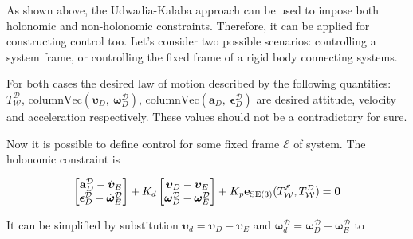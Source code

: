 As shown above, the Udwadia-Kalaba approach can be used to impose both holonomic and 
non-holonomic constraints. Therefore, it can be applied for constructing control too. 
Let's consider two possible scenarios: controlling a system frame, or controlling the 
fixed frame of a rigid body connecting systems.

For both cases the desired law of motion described by the following quantities: 
$T_{\mathcal{W}}^{\mathcal{D}}$, $\text{columnVec}(\boldsymbol{\upsilon}_D, \ 
\boldsymbol{\omega}_D^{\mathcal{D}})$, $\text{columnVec}(\mathbf{a}_D, \ 
\boldsymbol{\epsilon}_D^{\mathcal{D}})$ are desired attitude, velocity and 
acceleration respectively. These values should not be a contradictory for 
sure. 

Now it is possible to define control for some fixed frame $\mathcal{E}$ of system. 
The holonomic constraint is 

\begin{equation}
    \begin{bmatrix}
        \mathbf{a}_D^{\mathcal{D}} - \dot{\boldsymbol{\upsilon}}_E \\
        \boldsymbol{\epsilon}_D^{\mathcal{D}} - 
        \dot{\boldsymbol{\omega}}_E^{\mathcal{D}}
    \end{bmatrix}
    + K_d
    \begin{bmatrix}
        \boldsymbol{\upsilon}_D  - \boldsymbol{\upsilon}_E \\
        \boldsymbol{\omega}_D^{\mathcal{D}} - 
        \boldsymbol{\omega}_E^{\mathcal{D}}
    \end{bmatrix}
    + K_p
    \mathbf{e}_{\text{SE}(3)}(T_{\mathcal{W}}^{\mathcal{E}}, T_{\mathcal{W}}^{\mathcal{D}})
    = \mathbf{0}
    \label{eqn:control_e_const}
\end{equation}

It can be simplified by substitution $\boldsymbol{\upsilon}_d = 
\boldsymbol{\upsilon}_D  - \boldsymbol{\upsilon}_E$ and 
$\boldsymbol{\omega}_d^{\mathcal{D}} = \boldsymbol{\omega}_D^{\mathcal{D}} - 
\boldsymbol{\omega}_E^{\mathcal{D}}$ to 

